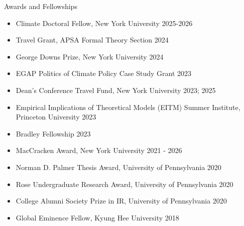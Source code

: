 \documentclass{resume} %
\begin{document}
\begin{rSection}{Awards and Fellowships}
\begin{itemize}
\item Climate Doctoral Fellow, New York University \hfill 2025-2026
\item Travel Grant, APSA Formal Theory Section \hfill 2024
\item George Downs Prize, New York University \hfill 2024
\item EGAP Politics of Climate Policy Case Study Grant \hfill 2023
\item Dean's Conference Travel Fund, New York University \hfill 2023; 2025
\item Empirical Implications of Theoretical Models (EITM) Summer Institute, Princeton University \hfill 2023
\item Bradley Fellowship \hfill 2023
\item MacCracken Award, New York University \hfill 2021 - 2026
\item Norman D. Palmer Thesis Award, University of Pennsylvania \hfill 2020
\item Rose Undergraduate Research Award, University of Pennsylvania \hfill 2020
\item College Alumni Society Prize in IR, University of Pennsylvania \hfill 2020
\item Global Eminence Fellow, Kyung Hee University \hfill 2018
\end{itemize}
\end{rSection}
\end{document}
